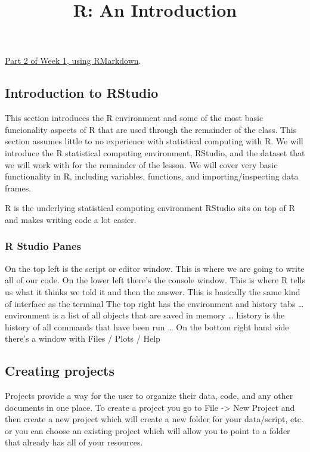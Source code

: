 \documentclass[]{article}
\title{R: An Introduction}
\author{}
\date{}
\begin{document}
\maketitle

\href{Week_1_RMarkdown.html}{Part 2 of Week 1, using RMarkdown}.

\subsection{Introduction to RStudio}\label{introduction-to-rstudio}

This section introduces the R environment and some of the most basic
funcionality aspects of R that are used through the remainder of the
class. This section assumes little to no experience with statistical
computing with R. We will introduce the R statistical computing
environment, RStudio, and the dataset that we will work with for the
remainder of the lesson. We will cover very basic functionality in R,
including variables, functions, and importing/inspecting data frames.

R is the underlying statistical computing environment RStudio sits on
top of R and makes writing code a lot easier.

\subsubsection{R Studio Panes}\label{r-studio-panes}

On the top left is the script or editor window. This is where we are
going to write all of our code. On the lower left there's the console
window. This is where R tells us what it thinks we told it and then the
answer. This is basically the same kind of interface as the terminal The
top right has the environment and history tabs \ldots{} environment is a
list of all objects that are saved in memory \ldots{} history is the
history of all commands that have been run \ldots{} On the bottom right
hand side there's a window with Files / Plots / Help

\subsection{Creating projects}\label{creating-projects}

Projects provide a way for the user to organize their data, code, and
any other documents in one place. To create a project you go to File
-\textgreater{} New Project and then create a new project which will
create a new folder for your data/script, etc. or you can choose an
existing project which will allow you to point to a folder that already
has all of your resources.
\end{document}
